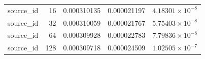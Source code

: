 \begin{longtable}{lrrrr}
source\_id & 16 & 0.000310135 & 0.000021197 & $4.18301\times10^{-8}$\\

source\_id & 32 & 0.000310059 & 0.000021767 & $5.75403\times10^{-8}$\\

source\_id & 64 & 0.000309928 & 0.000022783 & $7.79836\times10^{-8}$\\

source\_id & 128 & 0.000309718 & 0.000024509 & $1.02505\times10^{-7}$\\

\bottomrule
\end{longtable}
\endgroup
